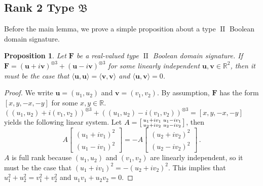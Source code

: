 \documentclass[11pt]{article}
\newtheorem{proposition}[theorem]{Proposition}
\DeclareMathOperator{\typeii}{II}
\newcommand{\teh}{^{\otimes 3}}
\newcommand{\ternarytractz}{$\mathfrak{B}$\xspace}
\begin{document}
\subsection{Rank 2 Type \texorpdfstring{\ternarytractz}{B}}
Before the main lemma, we prove a simple proposition about a type $\typeii$ Boolean domain signature.
\begin{proposition}\label{prop:typeii-same-norm}
  Let $\mathbf{F}$ be a real-valued type $\typeii$ Boolean domain signature.
  If $\mathbf{F} = (\mathbf{u} + i \mathbf{v}) \teh + (\mathbf{u} - i \mathbf{v})\teh$ for some linearly independent $\mathbf{u}, \mathbf{v} \in \mathbb{R}^2$,
  then it must be the case that $\langle \mathbf{u}, \mathbf{u} \rangle = \langle \mathbf{v}, \mathbf{v} \rangle$ and $\langle \mathbf{u}, \mathbf{v} \rangle = 0$.
\end{proposition}
\begin{proof}
  We write $\mathbf{u} = (u_1, u_2)$ and $\mathbf{v} = (v_1, v_2)$.
  By assumption, $\mathbf{F}$ has the form $[x, y, -x, -y]$ for some $x, y \in \mathbb{R}$.
  $((u_1, u_2) + i (v_1, v_2))\teh + ((u_1, u_2) - i (v_1, v_2))\teh = [x, y, -x, -y]$ yields the following linear system.
  Let $A = \begin{bsmallmatrix}
  u_1 + i v_1 & u_1 - i v_1 \\
  u_2 + i v_2 & u_2 - i v_2
  \end{bsmallmatrix}$, then
  \[
    A \begin{bmatrix}
      (u_1 + i v_1)^2 \\ (u_1 - i v_1)^2
      \end{bmatrix} = - A \begin{bmatrix}
      (u_2 + i v_2)^2 \\ (u_2 - i v_2)^2
    \end{bmatrix} 
    \, .
  \]
  $A$ is full rank because $(u_1, u_2)$ and $(v_1, v_2)$ are linearly independent, so it must be the case that 
  $(u_1 + i v_1)^2 = - (u_2 + i v_2)^2$.
  This implies that $u_1^2 + u_2^2 = v_1^2 + v_2^2$ and $u_1 v_1 + u_2 v_2 = 0$.
\end{proof}
\end{document}
